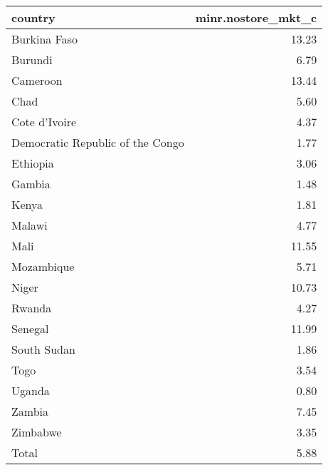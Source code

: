 \begin{table}[ht]
\centering
\begin{tabular}{lr}
  \hline
country & minr.nostore\_mkt\_c \\ 
  \hline
Burkina Faso & 13.23 \\ 
  Burundi & 6.79 \\ 
  Cameroon & 13.44 \\ 
  Chad & 5.60 \\ 
  Cote d'Ivoire & 4.37 \\ 
  Democratic Republic of the Congo & 1.77 \\ 
  Ethiopia & 3.06 \\ 
  Gambia & 1.48 \\ 
  Kenya & 1.81 \\ 
  Malawi & 4.77 \\ 
  Mali & 11.55 \\ 
  Mozambique & 5.71 \\ 
  Niger & 10.73 \\ 
  Rwanda & 4.27 \\ 
  Senegal & 11.99 \\ 
  South Sudan & 1.86 \\ 
  Togo & 3.54 \\ 
  Uganda & 0.80 \\ 
  Zambia & 7.45 \\ 
  Zimbabwe & 3.35 \\ 
  Total & 5.88 \\ 
   \hline
\end{tabular}
\end{table}
